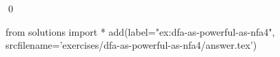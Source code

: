 
\begin{ex} 
  \label{ex:dfa-as-powerful-as-nfa4}
  
  \qed
\end{ex} 
\begin{python0}
from solutions import *
add(label="ex:dfa-as-powerful-as-nfa4",
    srcfilename='exercises/dfa-as-powerful-as-nfa4/answer.tex') 
\end{python0}

